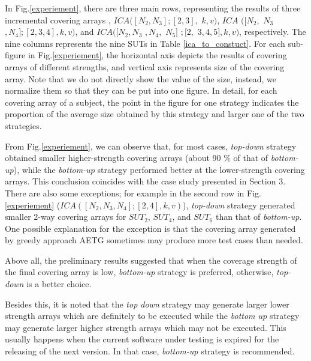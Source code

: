 \documentclass[conference]{IEEEtran}
\theoremstyle{definition}
\begin{document}
In Fig.\ref{experiement}, there are three main rows, representing the results of three incremental covering arrays , $ICA([N_{2},N_{3}]; [2, 3],$ $ k ,v)$, $ICA$ $([N_{2},$ $N_{3}$ $,N_{4}];[2, 3,4], k ,v)$, and $ICA([N_{2},N_{3}$ $,N_{4},$ $N_{5}]$ $;[2,$ $ 3,4,5], k ,v)$, respectively.  The nine columns represents the nine SUTs in Table \ref{ica_to_constuct}. For each sub-figure in Fig.\ref{experiement}, the horizontal axis depicts the results of covering arrays of different strengths, and vertical axis represents size of the covering array. Note that we do not directly show the value of the size, instead, we normalize them so that they can be put into one figure. In detail, for each covering array of a subject, the point in the figure for one strategy indicates the proportion of the average size obtained by this strategy and larger one of the two strategies.
%

From Fig.\ref{experiement}, we can observe that, for most cases, \emph{top-down} strategy obtained smaller higher-strength covering arrays (about 90 \% of that of \emph{bottom-up}), while the \emph{bottom-up} strategy performed better at the lower-strength covering arrays. This conclusion coincides with the case study presented in Section 3.  There are also some exceptions; for example in the second row in Fig. \ref{experiement} ($ICA([N_{2},N_{3},N_{4}]; [2, 4], k ,v)$), \emph{top-down} strategy generated smaller 2-way covering arrays for $SUT_{2}$, $SUT_{4}$, and $SUT_{6}$ than that of \emph{bottom-up}. One possible explanation for the exception is that the covering array generated by greedy approach AETG sometimes may produce more test cases than needed.


Above all, the preliminary results suggested that when the coverage strength of the final covering array is low, \emph{bottom-up} strategy is preferred, otherwise, \emph{top-down} is a better choice.

Besides this, it is noted that the \emph{top down} strategy may generate larger lower strength arrays which are definitely to be executed while the \emph{bottom up} strategy may generate larger higher strength arrays which may not be executed. This usually happens when the current software under testing is expired for the releasing of the next version. In that case, \emph{bottom-up} strategy is recommended.
\end{document}

